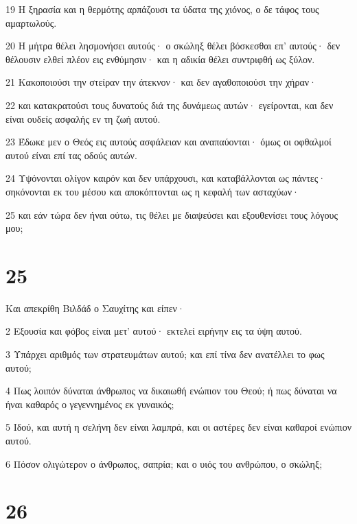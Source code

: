 \par 19 Η ξηρασία και η θερμότης αρπάζουσι τα ύδατα της χιόνος, ο δε τάφος τους αμαρτωλούς.
\par 20 Η μήτρα θέλει λησμονήσει αυτούς· ο σκώληξ θέλει βόσκεσθαι επ' αυτούς· δεν θέλουσιν ελθεί πλέον εις ενθύμησιν· και η αδικία θέλει συντριφθή ως ξύλον.
\par 21 Κακοποιούσι την στείραν την άτεκνον· και δεν αγαθοποιούσι την χήραν·
\par 22 και κατακρατούσι τους δυνατούς διά της δυνάμεως αυτών· εγείρονται, και δεν είναι ουδείς ασφαλής εν τη ζωή αυτού.
\par 23 Έδωκε μεν ο Θεός εις αυτούς ασφάλειαν και αναπαύονται· όμως οι οφθαλμοί αυτού είναι επί τας οδούς αυτών.
\par 24 Υψόνονται ολίγον καιρόν και δεν υπάρχουσι, και καταβάλλονται ως πάντες· σηκόνονται εκ του μέσου και αποκόπτονται ως η κεφαλή των ασταχύων·
\par 25 και εάν τώρα δεν ήναι ούτω, τις θέλει με διαψεύσει και εξουθενίσει τους λόγους μου;

\chapter{25}

\par Και απεκρίθη Βιλδάδ ο Σαυχίτης και είπεν·
\par 2 Εξουσία και φόβος είναι μετ' αυτού· εκτελεί ειρήνην εις τα ύψη αυτού.
\par 3 Υπάρχει αριθμός των στρατευμάτων αυτού; και επί τίνα δεν ανατέλλει το φως αυτού;
\par 4 Πως λοιπόν δύναται άνθρωπος να δικαιωθή ενώπιον του Θεού; ή πως δύναται να ήναι καθαρός ο γεγεννημένος εκ γυναικός;
\par 5 Ιδού, και αυτή η σελήνη δεν είναι λαμπρά, και οι αστέρες δεν είναι καθαροί ενώπιον αυτού.
\par 6 Πόσον ολιγώτερον ο άνθρωπος, σαπρία; και ο υιός του ανθρώπου, ο σκώληξ;

\chapter{26}

